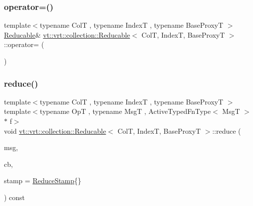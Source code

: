 \subsubsection{\texorpdfstring{operator=()}{operator=()}}
{\footnotesize\ttfamily template$<$typename ColT , typename IndexT , typename Base\+ProxyT $>$ \\
\hyperlink{structvt_1_1vrt_1_1collection_1_1_reducable}{Reducable}\& \hyperlink{structvt_1_1vrt_1_1collection_1_1_reducable}{vt\+::vrt\+::collection\+::\+Reducable}$<$ ColT, IndexT, Base\+ProxyT $>$\+::operator= (\begin{DoxyParamCaption}\item[{\hyperlink{structvt_1_1vrt_1_1collection_1_1_reducable}{Reducable}$<$ ColT, IndexT, Base\+ProxyT $>$ const \&}]{ }\end{DoxyParamCaption})\hspace{0.3cm}{\ttfamily [default]}}

\mbox{\label{structvt_1_1vrt_1_1collection_1_1_reducable_a01c048ad987be949f4c2eebf3b71e4a5}} 
\subsubsection{\texorpdfstring{reduce()}{reduce()}\hspace{0.1cm}{\footnotesize\ttfamily [1/4]}}
{\footnotesize\ttfamily template$<$typename ColT , typename IndexT , typename Base\+ProxyT $>$ \\
template$<$typename OpT , typename MsgT , Active\+Typed\+Fn\+Type$<$ Msg\+T $>$ $\ast$ f$>$ \\
void \hyperlink{structvt_1_1vrt_1_1collection_1_1_reducable}{vt\+::vrt\+::collection\+::\+Reducable}$<$ ColT, IndexT, Base\+ProxyT $>$\+::reduce (\begin{DoxyParamCaption}\item[{MsgT $\ast$const}]{msg,  }\item[{\hyperlink{namespacevt_a36db99df4c973d48b1118a293fff533f}{Callback}$<$ MsgT $>$}]{cb,  }\item[{\hyperlink{structvt_1_1vrt_1_1collection_1_1_reducable_a19f80baf23f36dad4948ef07322fd0cb}{Reduce\+Stamp}}]{stamp = {\ttfamily \hyperlink{structvt_1_1vrt_1_1collection_1_1_reducable_a19f80baf23f36dad4948ef07322fd0cb}{Reduce\+Stamp}\{\}} }\end{DoxyParamCaption}) const}

